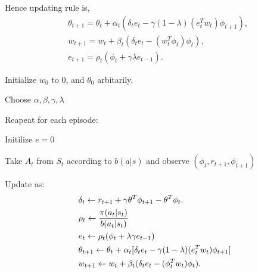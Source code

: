\documentclass[11pt,a4paper]{article}
\begin{document}
Hence updating rule is,
\begin{align}
& \theta_{t+1} = \theta_t + \alpha_t(\delta_t e_t - \gamma(1-\lambda)(e_t^T w_t)\phi_{t+1}), \\ 
& w_{t+1} = w_t + \beta_t (\delta_t e_t -(w_t^T\phi_t)\phi_t),\\ 
& e_{t+1} = \rho_t(\phi_t + \gamma \lambda e_{t-1}).
\end{align}
\begin{tcolorbox}[title=GTD$(\lambda)$ with linear function approximation]
Initialize $w_0$ to $0$, and $\theta_0$ arbitarily. \par 
Choose $\alpha,\beta,\gamma,\lambda$ \par 
Reapeat for each episode:\par 
\hspace{1cm} Initilize $e=0$ \par 
\hspace{1cm} Take $A_t$ from $S_t$ according to $b(a|s)$ and observe $(\phi_t,r_{t+1},\phi_{t+1})$ \par 
\hspace{1cm} Update as:
\hspace{1cm} 
\begin{equation*}
\aligned 
& \delta_t \leftarrow r_{t+1} + \gamma \theta^T \phi_{t+1} - \theta^T\phi_t. \\ 
& \rho_t \leftarrow \frac{\pi(a_t|s_t)}{b(a_t|s_t)} \\ 
& e_t \leftarrow \rho_t (\phi_t + \lambda\gamma e_{t-1}) \\ 
& \theta_{t+1} \leftarrow \theta_t + \alpha_t[\delta_t e_t -\gamma(1-\lambda)(e_t^Tw_t)\phi_{t+1}] \\ 
& w_{t+1} \leftarrow w_t + \beta_t(\delta_t e_t - (\phi_t^T w_t)\phi_t).
\endaligned
\end{equation*}
\end{tcolorbox}
\end{document}
